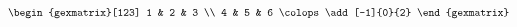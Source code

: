 \documentclass{article}
\begin{document}
\begin{equation*}
    \begin{gexmatrix}[123]
        1 & 2 & 3 \\
        4 & 5 & 6
        \colops
        \add[-1]{0}{2}
    \end{gexmatrix}
\end{equation*}
\end{document}

